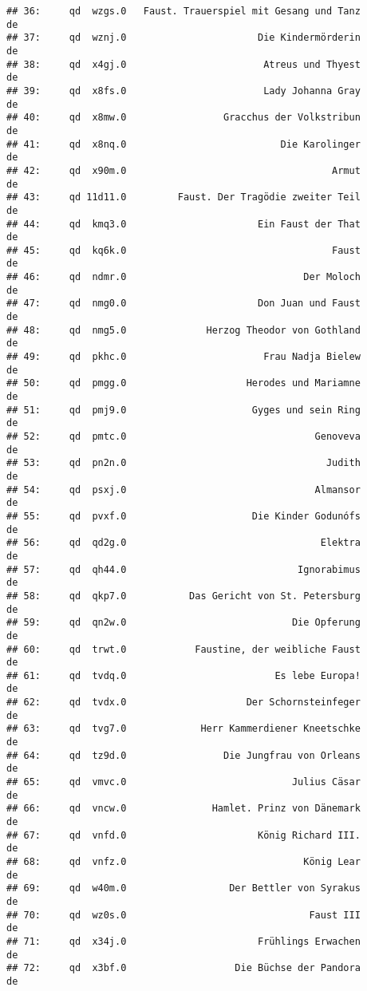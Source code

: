 \documentclass[]{book}
\begin{document}
\begin{verbatim}
## 36:     qd  wzgs.0   Faust. Trauerspiel mit Gesang und Tanz       de
## 37:     qd  wznj.0                       Die Kindermörderin       de
## 38:     qd  x4gj.0                        Atreus und Thyest       de
## 39:     qd  x8fs.0                        Lady Johanna Gray       de
## 40:     qd  x8mw.0                 Gracchus der Volkstribun       de
## 41:     qd  x8nq.0                           Die Karolinger       de
## 42:     qd  x90m.0                                    Armut       de
## 43:     qd 11d11.0         Faust. Der Tragödie zweiter Teil       de
## 44:     qd  kmq3.0                       Ein Faust der That       de
## 45:     qd  kq6k.0                                    Faust       de
## 46:     qd  ndmr.0                               Der Moloch       de
## 47:     qd  nmg0.0                       Don Juan und Faust       de
## 48:     qd  nmg5.0              Herzog Theodor von Gothland       de
## 49:     qd  pkhc.0                        Frau Nadja Bielew       de
## 50:     qd  pmgg.0                     Herodes und Mariamne       de
## 51:     qd  pmj9.0                      Gyges und sein Ring       de
## 52:     qd  pmtc.0                                 Genoveva       de
## 53:     qd  pn2n.0                                   Judith       de
## 54:     qd  psxj.0                                 Almansor       de
## 55:     qd  pvxf.0                      Die Kinder Godunófs       de
## 56:     qd  qd2g.0                                  Elektra       de
## 57:     qd  qh44.0                              Ignorabimus       de
## 58:     qd  qkp7.0           Das Gericht von St. Petersburg       de
## 59:     qd  qn2w.0                             Die Opferung       de
## 60:     qd  trwt.0            Faustine, der weibliche Faust       de
## 61:     qd  tvdq.0                          Es lebe Europa!       de
## 62:     qd  tvdx.0                     Der Schornsteinfeger       de
## 63:     qd  tvg7.0             Herr Kammerdiener Kneetschke       de
## 64:     qd  tz9d.0                 Die Jungfrau von Orleans       de
## 65:     qd  vmvc.0                             Julius Cäsar       de
## 66:     qd  vncw.0               Hamlet. Prinz von Dänemark       de
## 67:     qd  vnfd.0                       König Richard III.       de
## 68:     qd  vnfz.0                               König Lear       de
## 69:     qd  w40m.0                  Der Bettler von Syrakus       de
## 70:     qd  wz0s.0                                Faust III       de
## 71:     qd  x34j.0                       Frühlings Erwachen       de
## 72:     qd  x3bf.0                   Die Büchse der Pandora       de

\end{verbatim}
\end{document}
